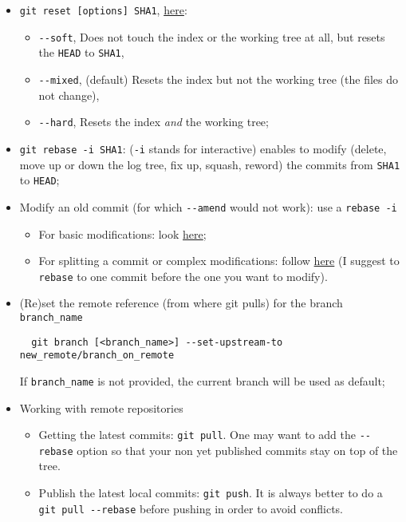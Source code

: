 \documentclass[a4paper,12pt,%
              final%
              ]{article}
\begin{document}
\begin{itemize}
\begin{itemize}
    \end{itemize}
  \item \verb|git reset [options] SHA1|, \href{https://git-scm.com/docs/git-reset}{here}:
    \begin{itemize}
      \item \verb|--soft|, Does not touch the index or the working tree at all, but resets the \texttt{HEAD} to \texttt{SHA1},
      \item \verb|--mixed|, (default) Resets the index but not the working tree (the files do not change),
      \item \verb|--hard|, Resets the index \emph{and} the working tree;
    \end{itemize}
  \item \verb|git rebase -i SHA1|: (\texttt{-i} stands for interactive) enables to modify (delete, move up or down the log tree, fix up, squash, reword) the commits from \texttt{SHA1} to \texttt{HEAD};
  \item Modify an old commit (for which \verb|--amend| would not work): use a \texttt{rebase -i}
    \begin{itemize}
      \item For basic modifications: look \href{https://stackoverflow.com/questions/1186535/how-to-modify-a-specified-commit}{here};
      \item For splitting a commit or complex modifications: follow \href{https://stackoverflow.com/questions/6217156/break-a-previous-commit-into-multiple-commits}{here} (I suggest to \texttt{rebase} to one commit before the one you want to modify).
    \end{itemize}
  \item (Re)set the remote reference (from where git pulls) for the branch \verb|branch_name|
\begin{verbatim}
  git branch [<branch_name>] --set-upstream-to new_remote/branch_on_remote
\end{verbatim}
    If \verb|branch_name| is not provided, the current branch will be used as default;
  \item Working with remote repositories
    \begin{itemize}
      \item Getting the latest commits: \verb|git pull|. One may want to add the \verb|--rebase| option so that your non yet published commits stay on top of the tree.
      \item Publish the latest local commits: \verb|git push|. It is always better to do a \verb|git pull --rebase| before pushing in order to avoid conflicts.

\end{itemize}
\end{itemize}
\end{document}
